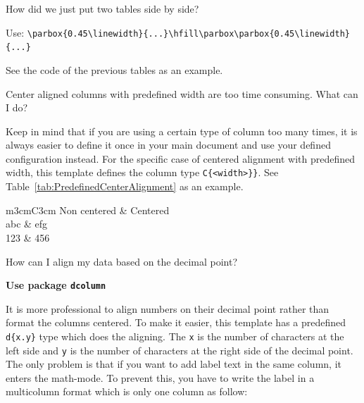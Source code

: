 \begin{QandA}
\begin{answered}
	\end{answered}



\item How did we just put two tables side by side?

	\begin{answered}
		Use: \verb|\parbox{0.45\linewidth}{...}\hfill\parbox\parbox{0.45\linewidth}{...}| 
		
		See the code of the previous tables as an example.
	
	\end{answered}



\item Center aligned columns with predefined width are too time consuming. What can I do?

	\begin{answered}
		Keep in mind that if you are using a certain type of column too many times, it is always easier to define it once in your main document and use your defined configuration instead. For the specific case of centered alignment with predefined width, this template defines the column type \verb|C{<width>}}|. See Table~\ref{tab:PredefinedCenterAlignment} as an example.
		
	\begin{table}[ht]
	\centering
  	\caption{An example of a predefined table formats}
  	\begin{tabular}{m{3cm}C{3cm}}
	\toprule
		Non centered & Centered \\
	\midrule
		abc & efg \\
		123 & 456 \\
	\bottomrule
	\end{tabular}
	
	\label{tab:PredefinedCenterAlignment}
	\end{table}
		
	\end{answered}


	
\item How can I align my data based on the decimal point?

	\begin{answered}
		
		\textbf{Use package \texttt{dcolumn}}
		
		It is more professional to align numbers on their decimal point rather than format the columns centered. To make it easier, this template has a predefined \verb|d{x.y}| type which does the aligning. The \texttt{x} is the number of characters at the left side and \texttt{y} is the number of characters at the right side of the decimal point. The only problem is that if you want to add label text in the same column, it enters the math-mode. To prevent this, you have to write the label in a multicolumn format which is only one column as follow:
		

\end{answered}
\end{QandA}
